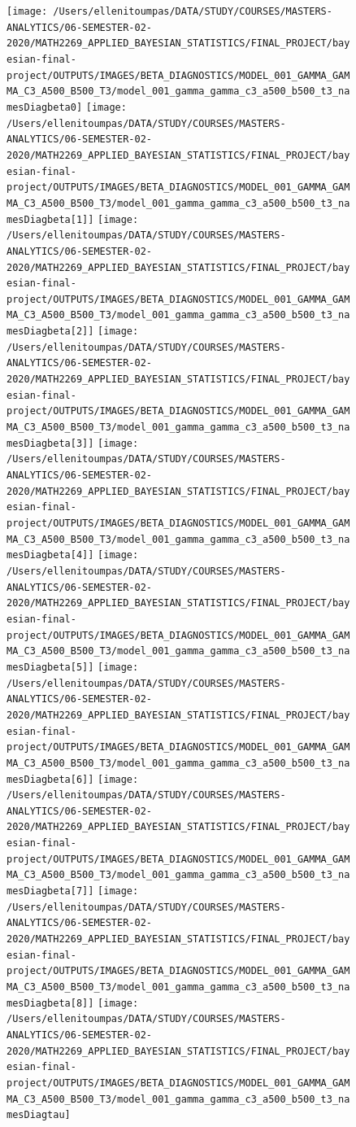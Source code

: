 \documentclass[12pt]{article}
\begin{document}
\begin{figure}[H]
\texttt{[image: /Users/ellenitoumpas/DATA/STUDY/COURSES/MASTERS-ANALYTICS/06-SEMESTER-02-2020/MATH2269\_APPLIED\_BAYESIAN\_STATISTICS/FINAL\_PROJECT/bayesian-final-project/OUTPUTS/IMAGES/BETA\_DIAGNOSTICS/MODEL\_001\_GAMMA\_GAMMA\_C3\_A500\_B500\_T3/model\_001\_gamma\_gamma\_c3\_a500\_b500\_t3\_namesDiagbeta0]} \texttt{[image: /Users/ellenitoumpas/DATA/STUDY/COURSES/MASTERS-ANALYTICS/06-SEMESTER-02-2020/MATH2269\_APPLIED\_BAYESIAN\_STATISTICS/FINAL\_PROJECT/bayesian-final-project/OUTPUTS/IMAGES/BETA\_DIAGNOSTICS/MODEL\_001\_GAMMA\_GAMMA\_C3\_A500\_B500\_T3/model\_001\_gamma\_gamma\_c3\_a500\_b500\_t3\_namesDiagbeta[1]]} \texttt{[image: /Users/ellenitoumpas/DATA/STUDY/COURSES/MASTERS-ANALYTICS/06-SEMESTER-02-2020/MATH2269\_APPLIED\_BAYESIAN\_STATISTICS/FINAL\_PROJECT/bayesian-final-project/OUTPUTS/IMAGES/BETA\_DIAGNOSTICS/MODEL\_001\_GAMMA\_GAMMA\_C3\_A500\_B500\_T3/model\_001\_gamma\_gamma\_c3\_a500\_b500\_t3\_namesDiagbeta[2]]} \texttt{[image: /Users/ellenitoumpas/DATA/STUDY/COURSES/MASTERS-ANALYTICS/06-SEMESTER-02-2020/MATH2269\_APPLIED\_BAYESIAN\_STATISTICS/FINAL\_PROJECT/bayesian-final-project/OUTPUTS/IMAGES/BETA\_DIAGNOSTICS/MODEL\_001\_GAMMA\_GAMMA\_C3\_A500\_B500\_T3/model\_001\_gamma\_gamma\_c3\_a500\_b500\_t3\_namesDiagbeta[3]]} \texttt{[image: /Users/ellenitoumpas/DATA/STUDY/COURSES/MASTERS-ANALYTICS/06-SEMESTER-02-2020/MATH2269\_APPLIED\_BAYESIAN\_STATISTICS/FINAL\_PROJECT/bayesian-final-project/OUTPUTS/IMAGES/BETA\_DIAGNOSTICS/MODEL\_001\_GAMMA\_GAMMA\_C3\_A500\_B500\_T3/model\_001\_gamma\_gamma\_c3\_a500\_b500\_t3\_namesDiagbeta[4]]} \texttt{[image: /Users/ellenitoumpas/DATA/STUDY/COURSES/MASTERS-ANALYTICS/06-SEMESTER-02-2020/MATH2269\_APPLIED\_BAYESIAN\_STATISTICS/FINAL\_PROJECT/bayesian-final-project/OUTPUTS/IMAGES/BETA\_DIAGNOSTICS/MODEL\_001\_GAMMA\_GAMMA\_C3\_A500\_B500\_T3/model\_001\_gamma\_gamma\_c3\_a500\_b500\_t3\_namesDiagbeta[5]]} \texttt{[image: /Users/ellenitoumpas/DATA/STUDY/COURSES/MASTERS-ANALYTICS/06-SEMESTER-02-2020/MATH2269\_APPLIED\_BAYESIAN\_STATISTICS/FINAL\_PROJECT/bayesian-final-project/OUTPUTS/IMAGES/BETA\_DIAGNOSTICS/MODEL\_001\_GAMMA\_GAMMA\_C3\_A500\_B500\_T3/model\_001\_gamma\_gamma\_c3\_a500\_b500\_t3\_namesDiagbeta[6]]} \texttt{[image: /Users/ellenitoumpas/DATA/STUDY/COURSES/MASTERS-ANALYTICS/06-SEMESTER-02-2020/MATH2269\_APPLIED\_BAYESIAN\_STATISTICS/FINAL\_PROJECT/bayesian-final-project/OUTPUTS/IMAGES/BETA\_DIAGNOSTICS/MODEL\_001\_GAMMA\_GAMMA\_C3\_A500\_B500\_T3/model\_001\_gamma\_gamma\_c3\_a500\_b500\_t3\_namesDiagbeta[7]]} \texttt{[image: /Users/ellenitoumpas/DATA/STUDY/COURSES/MASTERS-ANALYTICS/06-SEMESTER-02-2020/MATH2269\_APPLIED\_BAYESIAN\_STATISTICS/FINAL\_PROJECT/bayesian-final-project/OUTPUTS/IMAGES/BETA\_DIAGNOSTICS/MODEL\_001\_GAMMA\_GAMMA\_C3\_A500\_B500\_T3/model\_001\_gamma\_gamma\_c3\_a500\_b500\_t3\_namesDiagbeta[8]]} \texttt{[image: /Users/ellenitoumpas/DATA/STUDY/COURSES/MASTERS-ANALYTICS/06-SEMESTER-02-2020/MATH2269\_APPLIED\_BAYESIAN\_STATISTICS/FINAL\_PROJECT/bayesian-final-project/OUTPUTS/IMAGES/BETA\_DIAGNOSTICS/MODEL\_001\_GAMMA\_GAMMA\_C3\_A500\_B500\_T3/model\_001\_gamma\_gamma\_c3\_a500\_b500\_t3\_namesDiagtau]} \end{figure}
\end{document}
